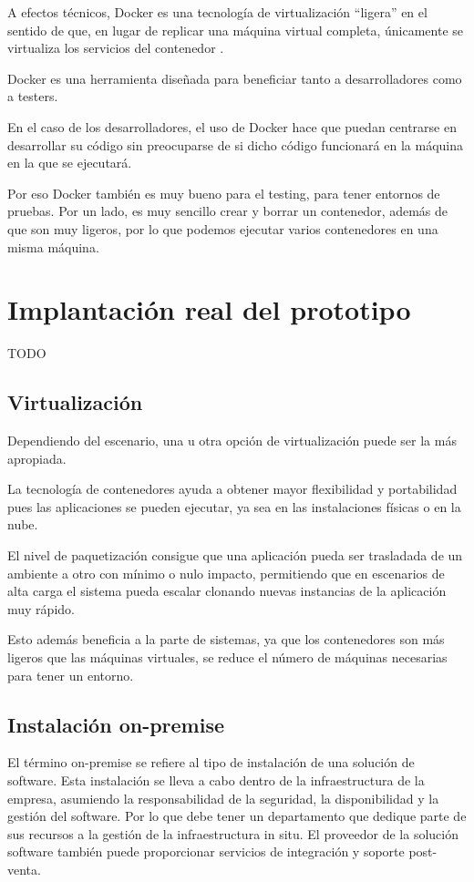 A efectos técnicos, Docker es una tecnología de virtualización “ligera” en el sentido de que, en lugar de replicar una máquina virtual completa, únicamente se virtualiza los servicios del contenedor \cite{docker3}.

Docker es una herramienta diseñada para beneficiar tanto a desarrolladores como a testers.

En el caso de los desarrolladores, el uso de Docker hace que puedan centrarse en desarrollar su código sin preocuparse de si dicho código funcionará en la máquina en la que se ejecutará.

Por eso Docker también es muy bueno para el testing, para tener entornos de pruebas. Por un lado, es muy sencillo crear y borrar un contenedor, además de que son muy ligeros, por lo que podemos ejecutar varios contenedores en una misma máquina.

\section{Implantación real del prototipo}

TODO

\subsection{Virtualización}

Dependiendo del escenario, una u otra opción de virtualización puede ser la más apropiada.

La tecnología de contenedores ayuda a obtener mayor flexibilidad y portabilidad pues las aplicaciones se pueden ejecutar, ya sea en las instalaciones físicas o en la nube.

El nivel de paquetización consigue que una aplicación pueda ser trasladada de un ambiente a otro con mínimo o nulo impacto, permitiendo que en escenarios de alta carga el sistema pueda escalar clonando nuevas instancias de la aplicación muy rápido.

Esto además beneficia a la parte de sistemas, ya que los contenedores son más ligeros que las máquinas virtuales, se reduce el número de máquinas necesarias para tener un entorno.

\subsection{Instalación on-premise}

El término on-premise se refiere al tipo de instalación de una solución de software. Esta instalación se lleva a cabo dentro de la infraestructura de la empresa, asumiendo la responsabilidad de la seguridad, la disponibilidad y la gestión del software. Por lo que debe tener un departamento que dedique parte de sus recursos a la gestión de la infraestructura in situ. El proveedor de la solución software también puede proporcionar servicios de integración y soporte post-venta.

